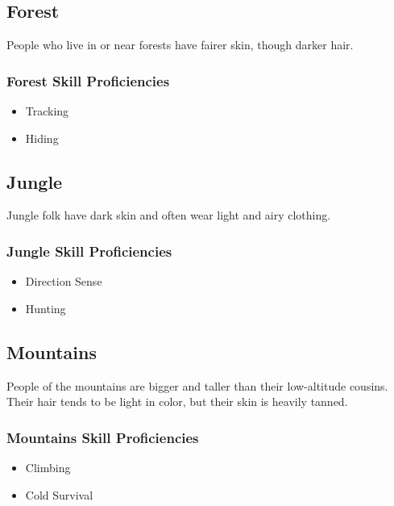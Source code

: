 \begin{multicols}{2}
\subsection{Forest}

People who live in or near forests have fairer skin, though darker
hair.

\subsubsection{Forest Skill Proficiencies}

\begin{itemize}
  \item Tracking
  \item Hiding
\end{itemize}

\subsection{Jungle}

Jungle folk have dark skin and often wear light and airy clothing.

\subsubsection{Jungle Skill Proficiencies}

\begin{itemize}
  \item Direction Sense
  \item Hunting
\end{itemize}

\subsection{Mountains}

People of the mountains are bigger and taller than their low-altitude
cousins. Their hair tends to be light in color, but their skin is heavily
tanned.

\subsubsection{Mountains Skill Proficiencies}

\begin{itemize}
  \item Climbing
  \item Cold Survival
\end{itemize}


\end{multicols}

